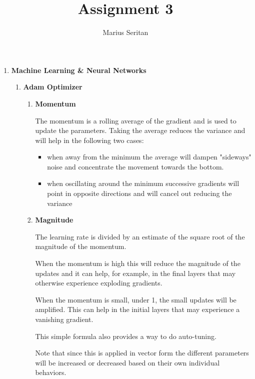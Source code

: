 \documentclass{article}
\begin{document}
\title{Assignment 3}
\author{Marius Seritan}
\maketitle



\begin{enumerate}[leftmargin=0pt,listparindent=0pt]
\item \textbf{Machine Learning \& Neural Networks}

\begin{enumerate}[leftmargin=0pt,listparindent=8pt]
\item \textbf{Adam Optimizer}

\begin{enumerate}[leftmargin=0pt,listparindent=0pt]

\item \textbf{Momentum}

The momentum is a rolling average of the gradient and is used to update the parameters. Taking the average reduces the variance and will help in the following two cases: 

\begin{itemize}
\item when away from the minimum the average will dampen "sideways" noise and concentrate the movement towards the bottom.
\item when oscillating around the minimum successive gradients will point in opposite directions and will cancel out reducing the variance
\end{itemize}

\item \textbf{Magnitude}

The learning rate is divided by an estimate of the square root of the magnitude of the momentum. 

When the momentum is high this will reduce the magnitude of the updates and it can help, for example, in the final layers that may otherwise experience exploding gradients. 

When the momentum is small, under 1, the small updates will be amplified. This can help in the initial layers that may experience a vanishing gradient.

This simple formula also provides a way to do auto-tuning. 

Note that since this is applied in vector form the different parameters will be increased or decreased based on their own individual behaviors.


\end{enumerate}
\end{enumerate}
\end{enumerate}
\end{document}
